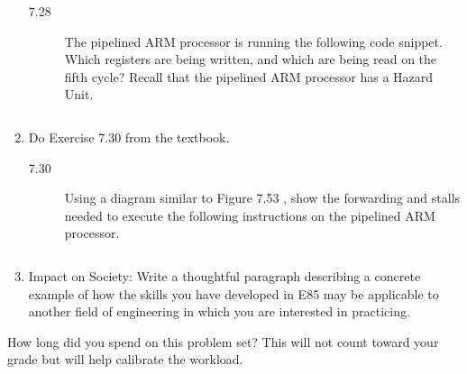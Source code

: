 \documentclass{e85}
\begin{document}
\begin{enumerate}
  \begin{description}
  \item[7.28] The pipelined ARM processor is running the following
    code snippet.  Which registers are being written, and which are
    being read on the fifth cycle?  Recall that the pipelined ARM
    processor has a Hazard Unit.

    \inputminted{text}{code/ddca-7.28.arm}

    \begin{solution}
    \end{solution}
  \end{description}

\item Do Exercise 7.30 from the textbook.

  \begin{description}
  \item[7.30] Using a diagram similar to Figure 7.53 \figurebelow,
    show the forwarding and stalls needed to execute the following
    instructions on the pipelined ARM processor.

    \inputminted{text}{code/ddca-7.30.arm}

    \begin{solution}
    \end{solution}
  \end{description}

\item Impact on Society: Write a thoughtful paragraph describing a
  concrete example of how the skills you have developed in E85 may be
  applicable to another field of engineering in which you are
  interested in practicing.

  \begin{solution}
  \end{solution}
\end{enumerate}

How long did you spend on this problem set?  This will not count
toward your grade but will help calibrate the workload.
\begin{solution}
\end{solution}
\end{document}
